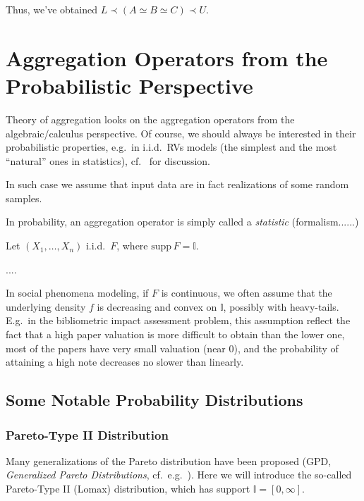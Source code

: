 \documentclass[11pt]{article}\usepackage{graphicx, color}
\renewcommand{\emph}[1]{\textsl{#1}}
\newcommand{\Ival}{\mathbb{I}}
\theoremstyle{remark}
\theoremstyle{definition}
\begin{document}
Thus, we've obtained $L \prec (A \simeq B \simeq C) \prec U$.








\section{Aggregation Operators from the Probabilistic Perspective}

Theory of aggregation looks on the aggregation operators
from the algebraic/calculus perspective. Of course, we should
always be interested in their probabilistic properties,
e.g.~in i.i.d.~RVs models (the simplest and the most ``natural''
ones in statistics), cf.~\cite{Gagolewski2011:PhD} for discussion.

In such case we assume that input data are in fact realizations
of some random samples.

In probability, an aggregation operator
is simply called a \emph{statistic} (formalism......)

Let $(X_1,\dots,X_n)$ i.i.d.~$F$, where $\mathrm{supp}\,F = \Ival$.

....

In social phenomena modeling, if $F$ is continuous,
we often assume that the underlying density $f$ is decreasing
and convex on $\Ival$, possibly with heavy-tails.
E.g.~in the bibliometric impact assessment problem,
this assumption reflect the fact that a high paper valuation
is more difficult to obtain than the lower one,
most of the papers have very small valuation (near $0$),
and the probability of attaining a high note decreases no slower
than linearly.


\subsection{Some Notable Probability Distributions}

\subsubsection{Pareto-Type II Distribution}

Many generalizations of the Pareto distribution
have been proposed (GPD, \textit{Generalized Pareto Distributions},
cf.~e.g.~\cite{VillasenorGonzalez2009:gofgpd,Zhang2010:estgpd}).
Here we will introduce the so-called Pareto-Type II (Lomax) distribution,
which has support $\Ival=[0,\infty]$.
\end{document}
